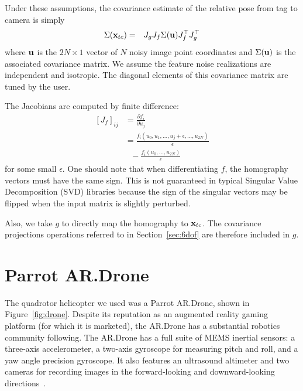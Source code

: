 \documentclass[conference]{IEEEtran}
\begin{document}
Under these assumptions, the covariance estimate of the relative pose from tag to camera
is simply
\begin{eqnarray*}
  \Sigma({{\bf x}_{tc}}) & = & J_g J_f \Sigma({\bf u}) J_f^\top J_g^\top
\end{eqnarray*}
where ${\bf u}$ is the $2N \times 1$ vector of $N$ noisy image point coordinates and
$\Sigma({\bf u})$ is the associated covariance matrix.  We assume the feature noise
realizations are independent and isotropic. The diagonal elements of this covariance
matrix are tuned by the user.

The Jacobians are computed by finite difference:
\begin{align*}
  \left[J_f\right]_{ij} &=\frac{\partial f_i}{\partial u_j} \\
  &= \frac{f_i(u_0, u_1, \dots, u_j +
    \epsilon, \dots, u_{2N})}{\epsilon} \\
  & \ \ \  - \frac{f_i(u_0, \dots, u_{2N})}{\epsilon}
\end{align*}
for some small $\epsilon$. One should note that when differentiating $f$, the homography
vectors must have the same sign.  This is not guaranteed in typical Singular Value
Decomposition (SVD) libraries because the sign of the singular vectors may be flipped when
the input matrix is slightly perturbed.

Also, we take $g$ to directly map the homography to ${\bf x}_{tc}$.  The covariance
projections operations referred to in Section~\ref{sec:6dof} are therefore included in $g$.


\section{Parrot AR.Drone}
\label{sub:quadrotor}


The quadrotor helicopter we used was a Parrot AR.Drone, shown in Figure~\ref{fig:drone}.
Despite its reputation as an augmented reality gaming platform (for which it is
marketed), the AR.Drone has a substantial robotics community following. The AR.Drone has
a full suite of MEMS inertial sensors: a three-axis accelerometer, a two-axis gyroscope
for measuring pitch and roll, and a yaw angle precision gyroscope. It also features an
ultrasound altimeter and two cameras for recording images in the forward-looking and
downward-looking directions~\cite{ardronedevguide}.
\end{document}
